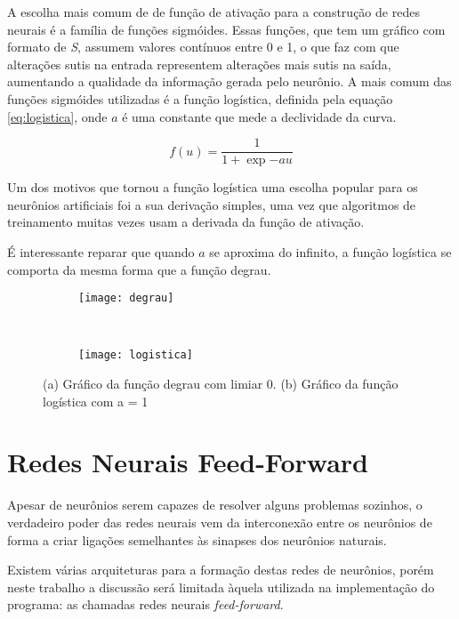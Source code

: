 A escolha mais comum de de função de ativação para a construção de redes neurais é a família de funções sigmóides. Essas funções, que tem um gráfico com formato de \textit{S}, assumem valores contínuos entre 0 e 1, o que faz com que alterações sutis na entrada representem alterações mais sutis na saída, aumentando a qualidade da informação gerada pelo neurônio. A mais comum das funções sigmóides utilizadas é a função logística, definida pela equação \ref{eq:logistica}, onde $a$ é uma constante que mede a declividade da curva.

\begin{equation}
	f(u) = \frac{1}{1 + \exp{-au}}
\label{eq:logistica}
\end{equation}

Um dos motivos que tornou a função logística uma escolha popular para os neurônios artificiais foi a sua derivação simples, uma vez que algoritmos de treinamento muitas vezes usam a derivada da função de ativação\cite{Kosabov}.

É interessante reparar que quando $a$ se aproxima do infinito, a função logística se comporta da mesma forma que a função degrau.

\begin{figure}
 \centering
\begin{subfigure}{.5\textwidth}
  \centering
  \texttt{[image: degrau]}
	\caption{}
	\label{fig:ativacao:sub:degrau}
\end{subfigure}\
\begin{subfigure}{.5\textwidth}
  \centering
  \texttt{[image: logistica]}
	\caption{}
	\label{fig:ativacao:sub:logistica}
\end{subfigure}
\caption{(a) Gráfico da função degrau com limiar 0. (b) Gráfico da função logística com a = 1}
\label{fig:ativacao}
\end{figure}




\section{Redes Neurais Feed-Forward}

Apesar de neurônios serem capazes de resolver alguns problemas sozinhos, o verdadeiro poder das redes neurais vem da interconexão entre os neurônios de forma a criar ligações semelhantes às sinapses dos neurônios naturais.

Existem várias arquiteturas para a formação destas redes de neurônios, porém neste trabalho a discussão será limitada àquela utilizada na implementação do programa: as chamadas redes neurais \textit{feed-forward}.


